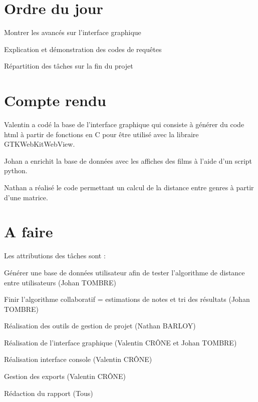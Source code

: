 \documentclass[11pt]{meetingmins}
\begin{document}
\maketitle

\section{Ordre du jour}
\begin{hiddenitems}
	\item Montrer les avancés sur l'interface graphique
	\item Explication et démonstration des codes de requêtes
	\item Répartition des tâches sur la fin du projet
\end{hiddenitems}
\section{Compte rendu}
Valentin a codé la base de l'interface graphique qui consiste à générer du code html à partir de fonctions en C pour être utilisé avec la libraire GTKWebKitWebView.\par
Johan a enrichit la base de données avec les affiches des films à l'aide d'un script python.\par
Nathan a réalisé le code permettant un calcul de la distance entre genres à partir d'une matrice.
\vspace{0.5cm}
\section{A faire}
Les attributions des tâches sont :
\begin{items}
	\item Générer une base de données utilisateur afin de tester l'algorithme de distance entre utilisateurs (Johan TOMBRE)
	\item Finir l'algorithme collaboratif = estimations de notes et tri des résultats (Johan TOMBRE)
	\item Réalisation des outils de gestion de projet (Nathan BARLOY)
	\item Réalisation de l'interface graphique (Valentin CRÔNE et Johan TOMBRE)
	\item Réalisation interface console (Valentin CRÔNE)
	\item Gestion des exports (Valentin CRÔNE)
	\item Rédaction du rapport (Tous)
\end{items}
\end{document}
